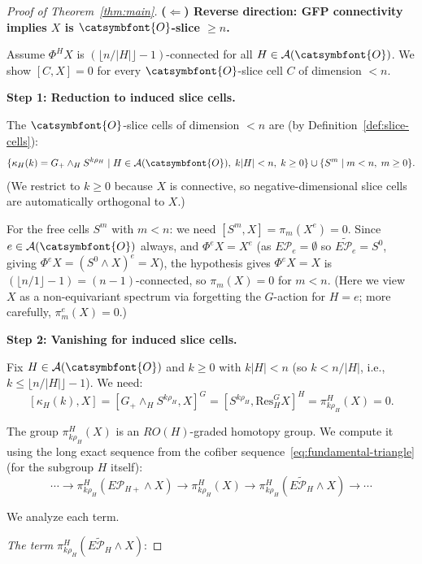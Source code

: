 \documentclass[12pt]{article}
\newcommand{\aO}{{\catsymbfont{O}}}
\theoremstyle{definition}
\begin{document}
\begin{proof}[Proof of Theorem~\ref{thm:main}]
\bigskip
\noindent\textbf{($\Leftarrow$) Reverse direction: GFP connectivity implies $X$ is $\aO$-slice $\geq n$.}

Assume $\Phi^H X$ is $(\lfloor n/|H|\rfloor - 1)$-connected for all $H\in\mathcal{A}(\aO)$.  We show $[C, X] = 0$ for every $\aO$-slice cell $C$ of dimension $< n$.

\medskip
\noindent\textbf{Step 1: Reduction to induced slice cells.}

The $\aO$-slice cells of dimension $< n$ are (by Definition~\ref{def:slice-cells}):
\[
   \{ \kappa_H(k) = G_+\wedge_H S^{k\rho_H} \mid H\in\mathcal{A}(\aO),\; k|H| < n,\; k\geq 0 \}
   \cup \{ S^m \mid m < n,\; m\geq 0 \}.
\]
(We restrict to $k\geq 0$ because $X$ is connective, so negative-dimensional slice cells are automatically orthogonal to $X$.)

For the free cells $S^m$ with $m < n$: we need $[S^m, X] = \pi_m(X^e) = 0$.  Since $e\in\mathcal{A}(\aO)$ always, and $\Phi^e X = X^e$ (as $E\mathcal{P}_e = \emptyset$ so $\widetilde{E\mathcal{P}_e} = S^0$, giving $\Phi^e X = (S^0\wedge X)^e = X$), the hypothesis gives $\Phi^e X = X$ is $(\lfloor n/1\rfloor - 1)=(n-1)$-connected, so $\pi_m(X) = 0$ for $m < n$.  (Here we view $X$ as a non-equivariant spectrum via forgetting the $G$-action for $H=e$; more carefully, $\pi_m^e(X) = 0$.)

\medskip
\noindent\textbf{Step 2: Vanishing for induced slice cells.}

Fix $H\in\mathcal{A}(\aO)$ and $k\geq 0$ with $k|H| < n$ (so $k < n/|H|$, i.e., $k\leq \lfloor n/|H|\rfloor - 1$).  We need:
\[
   [\kappa_H(k), X] = [G_+\wedge_H S^{k\rho_H}, X]^G = [S^{k\rho_H}, \mathrm{Res}^G_H X]^H = \pi_{k\rho_H}^H(X) = 0.
\]

The group $\pi_{k\rho_H}^H(X)$ is an $RO(H)$-graded homotopy group.  We compute it using the long exact sequence from the cofiber sequence~\eqref{eq:fundamental-triangle} (for the subgroup $H$ itself):
\begin{equation}\label{eq:les-H}
   \cdots \to \pi_{k\rho_H}^H(E\mathcal{P}_{H+}\wedge X) \to \pi_{k\rho_H}^H(X) \to \pi_{k\rho_H}^H(\widetilde{E\mathcal{P}_H}\wedge X) \to \cdots
\end{equation}

We analyze each term.

\noindent\emph{The term $\pi_{k\rho_H}^H(\widetilde{E\mathcal{P}_H}\wedge X)$}:


\end{proof}
\end{document}
